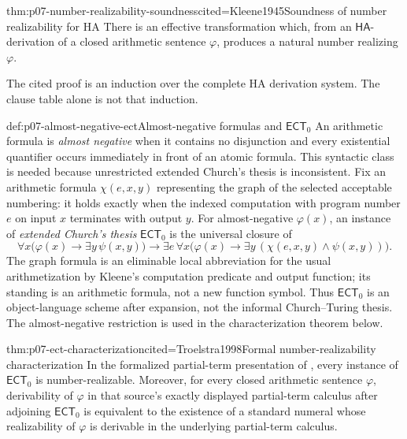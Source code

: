 \begin{hbtheorem}{thm:p07-number-realizability-soundness}{cited=Kleene1945}{Soundness of number realizability for HA}
There is an effective transformation which, from an
\(\mathsf{HA}\)-derivation of a closed arithmetic sentence \(\varphi\), produces a
natural number realizing \(\varphi\).
\end{hbtheorem}

The cited proof is an induction over the complete HA derivation system.  The
clause table alone is not that induction.

\begin{hbdefinition}{def:p07-almost-negative-ect}{Almost-negative formulas and \(\mathsf{ECT}_0\)}
An arithmetic formula is \emph{almost negative} when it contains no
disjunction and every existential quantifier occurs immediately in front of
an atomic formula.  This syntactic class is needed because unrestricted
extended Church's thesis is inconsistent.  Fix an arithmetic formula
\(\chi(e,x,y)\) representing the graph of the selected acceptable numbering:
it holds exactly when the indexed computation with program number \(e\) on
input \(x\) terminates with output \(y\).  For almost-negative
\(\varphi(x)\), an instance of \emph{extended Church's thesis}
\(\mathsf{ECT}_0\) is the universal closure of
\[
 \forall x\bigl(\varphi(x)\to\exists y\,\psi(x,y)\bigr)
 \to
 \exists e\,\forall x\bigl(\varphi(x)\to
   \exists y\,(\chi(e,x,y)\land\psi(x,y))\bigr).
\]
The graph formula is an eliminable local abbreviation for the usual
arithmetization by Kleene's computation predicate and output function; its
standing is an arithmetic formula, not a new function symbol.  Thus
\(\mathsf{ECT}_0\) is an object-language scheme after expansion, not the
informal Church--Turing thesis.  The almost-negative restriction is used in
the characterization theorem below.
\end{hbdefinition}

\begin{hbtheorem}{thm:p07-ect-characterization}{cited=Troelstra1998}{Formal number-realizability characterization}
In the formalized partial-term presentation of \cite{Troelstra1998}, every
instance of \(\mathsf{ECT}_0\) is number-realizable.  Moreover, for every
closed arithmetic sentence \(\varphi\), derivability of \(\varphi\) in that
source's exactly displayed partial-term calculus after adjoining
\(\mathsf{ECT}_0\) is equivalent to the existence of a standard numeral whose
realizability of \(\varphi\) is derivable in the underlying partial-term
calculus.
\end{hbtheorem}

